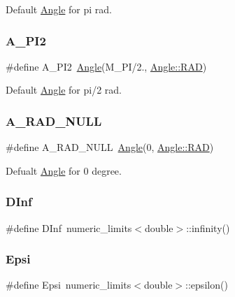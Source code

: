 Default \mbox{\hyperlink{class_angle}{Angle}} for pi rad. 

\mbox{\label{maths_8hh_a73d408ce54489e86b860679af5d24059}} 
\subsubsection{\texorpdfstring{A\_PI2}{A\_PI2}}
{\footnotesize\ttfamily \#define A\+\_\+\+P\+I2~\mbox{\hyperlink{class_angle}{Angle}}(M\+\_\+\+PI/2., \mbox{\hyperlink{class_angle_a4f7b9849ce8780bcba95ca3ee45cff77a93ab6b68075fd7a6fe724fbde5b13c1f}{Angle\+::\+R\+AD}})}



Default \mbox{\hyperlink{class_angle}{Angle}} for pi/2 rad. 

\mbox{\label{maths_8hh_a0da7d22251afe9ccf02289e0bceca28f}} 
\subsubsection{\texorpdfstring{A\_RAD\_NULL}{A\_RAD\_NULL}}
{\footnotesize\ttfamily \#define A\+\_\+\+R\+A\+D\+\_\+\+N\+U\+LL~\mbox{\hyperlink{class_angle}{Angle}}(0, \mbox{\hyperlink{class_angle_a4f7b9849ce8780bcba95ca3ee45cff77a93ab6b68075fd7a6fe724fbde5b13c1f}{Angle\+::\+R\+AD}})}



Defualt \mbox{\hyperlink{class_angle}{Angle}} for 0 degree. 

\mbox{\label{maths_8hh_a995779faef78614d4f074b7d444de767}} 
\subsubsection{\texorpdfstring{DInf}{DInf}}
{\footnotesize\ttfamily \#define D\+Inf~numeric\+\_\+limits$<$double$>$\+::infinity()}

\mbox{\label{maths_8hh_a78802b279ab85021d7f6bffe51621703}} 
\subsubsection{\texorpdfstring{Epsi}{Epsi}}
{\footnotesize\ttfamily \#define Epsi~numeric\+\_\+limits$<$double$>$\+::epsilon()}

